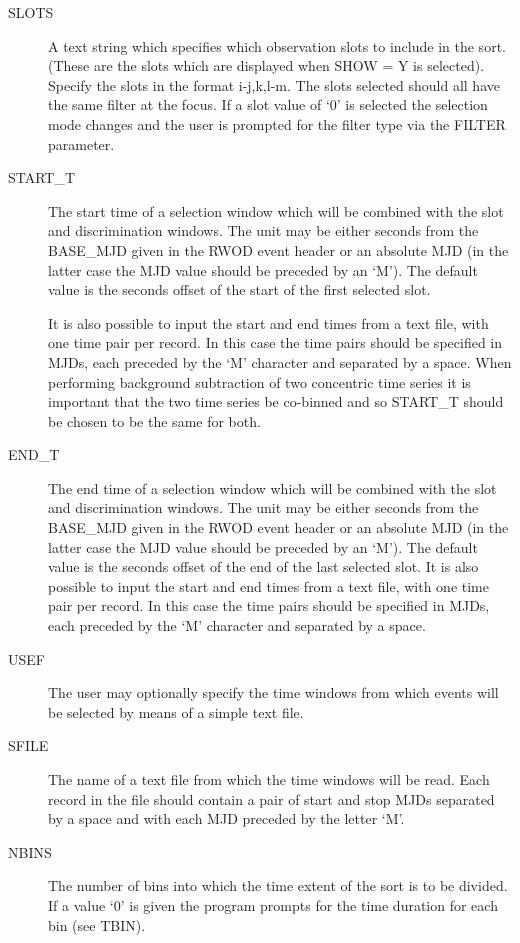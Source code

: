 \begin{description}
\item[SLOTS]
A text string which specifies which observation slots to include in
the sort. (These are the slots which are displayed when SHOW = Y is selected).
Specify the slots in the format i-j,k,l-m. The slots selected
should all have the same filter at the focus. If a slot value of `0' is
selected the selection mode changes and the user is prompted for the
filter type via the FILTER parameter.

\item[START\_T]
The start time of a selection window which will be combined with the
slot and discrimination windows. The unit may be either seconds from
the BASE\_MJD given in the RWOD event header or an absolute MJD (in the
latter case the MJD value should be preceded by an `M').  The default
value is the seconds offset of the start of the first selected slot.

It is also possible to input the start and end times from a text file,
with one time pair per record. In this case the time pairs should be
specified in MJDs, each preceded by the `M' character and separated by
a space. When performing background subtraction of two concentric time
series it is important that the two time series be co-binned and so
START\_T should be chosen to be the same for both.

\item[END\_T ]
The end time of a selection window which will be combined with the slot
and discrimination windows. The unit may be either seconds from the
BASE\_MJD given in the RWOD event header or an absolute MJD (in the
latter case the MJD value should be preceded by an `M'). The default
value is the seconds offset of the end of the last selected slot. It is
also possible to input the start and end times from a text file, with
one time pair per record. In this case the time pairs should be
specified in MJDs, each preceded by the `M' character and separated by
a space.

\item[USEF]
The user may optionally specify the time windows from which events
will be selected by means of a simple text file.

\item[SFILE]
The name of a text file from which the time windows will be read.
Each record in the file should contain a pair of start and stop MJDs
separated by a space and with each MJD preceded by the letter `M'.

\item[NBINS]
The number of bins into which the time extent of the sort
is to be divided. If a value `0' is given the program prompts for the
time duration for each bin (see TBIN).


\end{description}
